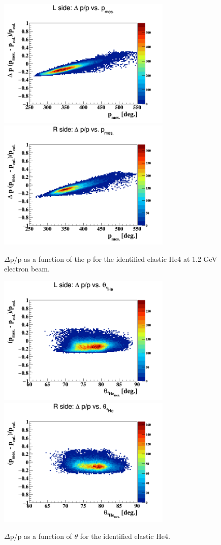 \begin{figure}[tbp]
\includegraphics[height=6.2cm]{fig/delta_p_p_elastic_l.png}
\includegraphics[height=6.2cm]{fig/delta_p_p_elastic_r.png}
\caption{$\Delta$p/p as a function of the p for the identified elastic He4 at 
1.2 GeV electron beam.   }
\label{fig:delta_p_p}
\end{figure}

\begin{figure}[tbp]
\includegraphics[height=6.2cm]{fig/delta_p_theta_elastic_l.png}
\includegraphics[height=6.2cm]{fig/delta_p_theta_elastic_r.png}
\caption{$\Delta$p/p as a function of $\theta$ for the identified elastic He4.}
\label{fig:delta_p_theta}
\end{figure}

